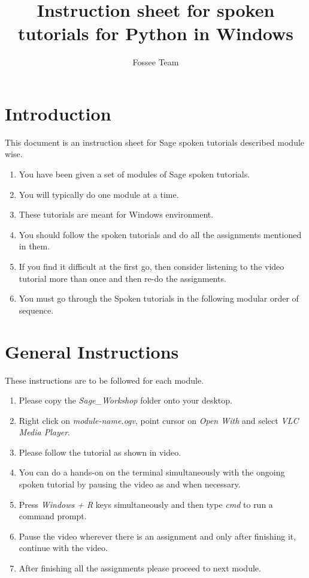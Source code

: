 \documentclass[11pt,twocolumn]{article}
\begin{document}
\title{Instruction sheet for spoken tutorials for Python in Windows}
\author{Fossee Team}
\maketitle
\section*{Introduction }
{This document is an instruction sheet for Sage spoken tutorials described module wise.}
\setlength{\columnsep}{15pt }
\begin{enumerate}
  \item You have been given a set of modules of Sage spoken tutorials.
  \item You will typically do one module at a time.
  \item These tutorials are meant for Windows environment.
  \item You should follow the spoken tutorials and do all the assignments mentioned in them.
   \item If you find it difficult at the first go, then consider listening to the video tutorial more than once and then re-do the assignments.
   \item You must go through the Spoken tutorials in the following modular order of sequence. 

\end{enumerate}

\section*{General Instructions}
{These instructions are to be followed for each module.}
\setlength{\columnsep}{15pt }
\begin{enumerate}
	\item Please copy the \emph{Sage\_Workshop} folder onto your desktop.
   
  \item Right click on \emph{module-name.ogv}, point cursor on \emph{Open With} and select \emph{VLC Media Player}.
  \item Please follow the tutorial as shown in video.
  \item You can do a hands-on on the terminal simultaneously with the ongoing spoken tutorial by pausing the video as   and when necessary.
  \item Press \emph{Windows +  R} keys simultaneously and then type \emph{cmd} to run a command prompt.
  \item Pause the video wherever there is an assignment and only after finishing it, continue with the video.
  \item After finishing all the assignments please proceed to next module. 

\end{enumerate}
\end{document}
